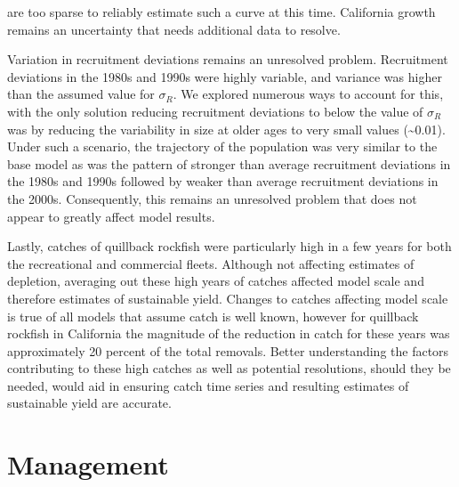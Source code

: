 \documentclass[11pt,
  english,
  letterpaper,
]{article}
\begin{document}
are too sparse to reliably estimate such a curve at this time. California growth remains an uncertainty that needs additional data to resolve.

\leavevmode\tagmcend\tagstructend\par


Variation in recruitment deviations remains an unresolved problem. Recruitment deviations in the 1980s and 1990s were highly variable, and variance was higher than the assumed value for {\({\sigma}_R\)\leavevmode\tagmcend\tagstructend}. We explored numerous ways to account for this, with the only solution reducing recruitment deviations to below the value of {\({\sigma}_R\)\leavevmode\tagmcend\tagstructend} was by reducing the variability in size at older ages to very small values (\textasciitilde0.01). Under such a scenario, the trajectory of the population was very similar to the base model as was the pattern of stronger than average recruitment deviations in the 1980s and 1990s followed by weaker than average recruitment deviations in the 2000s. Consequently, this remains an unresolved problem that does not appear to greatly affect model results.

\leavevmode\tagmcend\tagstructend\par


Lastly, catches of quillback rockfish were particularly high in a few years for both the recreational and commercial fleets. Although not affecting estimates of depletion, averaging out these high years of catches affected model scale and therefore estimates of sustainable yield. Changes to catches affecting model scale is true of all models that assume catch is well known, however for quillback rockfish in California the magnitude of the reduction in catch for these years was approximately 20 percent of the total removals. Better understanding the factors contributing to these high catches as well as potential resolutions, should they be needed, would aid in ensuring catch time series and resulting estimates of sustainable yield are accurate.

\leavevmode\tagmcend\tagstructend\par


\hypertarget{management}{%
\section{Management}\label{management}}
\end{document}
